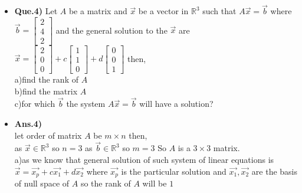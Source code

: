 \documentclass[a4paper,11pt]{article}
\numberwithin{equation}{section}
\begin{document}
\begin{itemize}
\begin{itemize}
    \item \textbf{Que.4)} Let $A$ be a matrix and $\vec{x}$ be a vector in $\mathbb{R}^3$ such that $A\vec{x}=\vec{b}$ where 
    $\vec{b}=\begin{bmatrix} 2\\4\\2\end{bmatrix}$ and the general solution to the $\vec{x}$ are $\vec{x}=\begin{bmatrix} 2\\0\\0\end{bmatrix}+c\begin{bmatrix} 1\\1\\0\end{bmatrix}+d\begin{bmatrix} 0\\0\\1\end{bmatrix}$ then,\\

    a)find the rank of $A$\\
    b)find the matrix $A$\\
    c)for which $\vec{b}$ the system $A\vec{x}=\vec{b}$ will have a solution?\\

    \item \textbf{Ans.4)}\\
    let order of matrix $A$ be $m\times n$ then,\\ as $\vec{x} \in \mathbb{R}^3$ so $n=3$ as $\vec{b} \in \mathbb{R}^3$ so $m=3$ So $A$ is a $3\times 3$ matrix.\\

    a)as we know that general solution of such system of linear equations is $\vec{x}=\vec{x_p}+c\vec{x_1}+d\vec{x_2}$ where $\vec{x_p}$ is the particular solution and $\vec{x_1},\vec{x_2}$ are the basis of null space of $A$ so the rank of $A$ will be $1$\\


\end{itemize}
\end{itemize}
\end{document}
